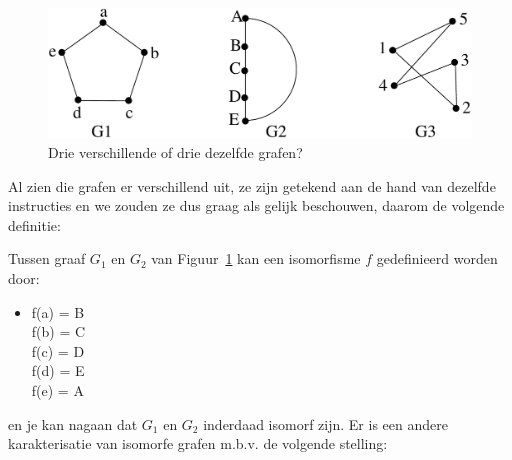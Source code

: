 \begin{figure}[ht]
\begin{center}
\includegraphics[width=0.6\linewidth,keepaspectratio]{experiment1}
\end{center}
\caption{Drie verschillende of drie dezelfde grafen?\label{experiment1}}
\end{figure}

Al zien die grafen er verschillend uit, ze zijn getekend aan de hand
van dezelfde instructies en we zouden ze dus graag als gelijk
beschouwen, daarom de volgende definitie:


Tussen graaf $G_{1}$ en $G_{2}$ van Figuur~\ref{experiment1} kan een
isomorfisme $f$ gedefinieerd worden door:
\begin{itemize}
\item[]
f(a) = B\\
f(b) = C\\
f(c) = D\\
f(d) = E\\
f(e) = A
\end{itemize}

en je kan nagaan dat $G_{1}$ en $G_{2}$ inderdaad isomorf zijn. Er is
een andere karakterisatie van isomorfe grafen m.b.v. de volgende stelling:

